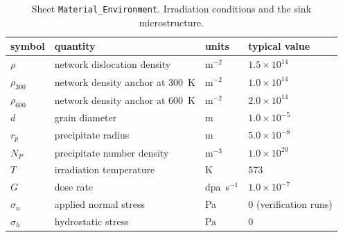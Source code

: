 \documentclass[11pt]{article}
\begin{document}
\begin{table}[htbp]
\centering
\caption{Sheet \texttt{Material\_Environment}. Irradiation conditions and the
sink microstructure.}
\label{tab:matenv}
\begin{tabular}{@{}llll@{}}
\toprule
symbol & quantity & units & typical value \\
\midrule
$\rho$      & network dislocation density & m$^{-2}$ & $1.5\times10^{14}$ \\
$\rho_{300}$ & network density anchor at 300~K & m$^{-2}$ & $1.0\times10^{14}$ \\
$\rho_{600}$ & network density anchor at 600~K & m$^{-2}$ & $2.0\times10^{14}$ \\
$d$         & grain diameter & m & $1.0\times10^{-5}$ \\
$r_p$       & precipitate radius & m & $5.0\times10^{-8}$ \\
$N_P$       & precipitate number density & m$^{-3}$ & $1.0\times10^{20}$ \\
$T$         & irradiation temperature & K & $573$ \\
$G$         & dose rate & dpa~s$^{-1}$ & $1.0\times10^{-7}$ \\
$\sigma_n$  & applied normal stress & Pa & $0$ (verification runs) \\
$\sigma_h$  & hydrostatic stress & Pa & $0$ \\
\bottomrule
\end{tabular}
\end{table}
\end{document}
